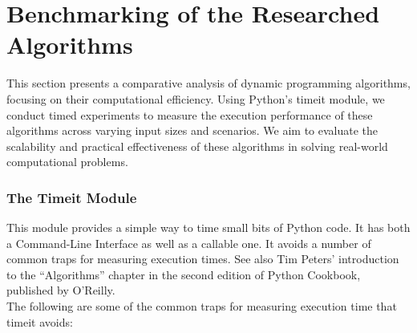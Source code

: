 \chapter{Benchmarking of the Researched Algorithms}
This section presents a comparative analysis of dynamic programming algorithms,
focusing on their computational efficiency.
Using Python's timeit module,
we conduct timed experiments to measure the execution performance of these algorithms across varying input sizes and scenarios.
We aim to evaluate the scalability and practical effectiveness of these algorithms in solving real-world computational problems. 

\subsection*{The Timeit Module}
This module provides a simple way to time small bits of Python code.
It has both a Command-Line Interface as well as a callable one.
It avoids a number of common traps for measuring execution times.
See also Tim Peters’ introduction to the “Algorithms” chapter in the second edition of Python Cookbook,
published by O’Reilly.\\
The following are some of the common traps for measuring execution time that timeit avoids:
